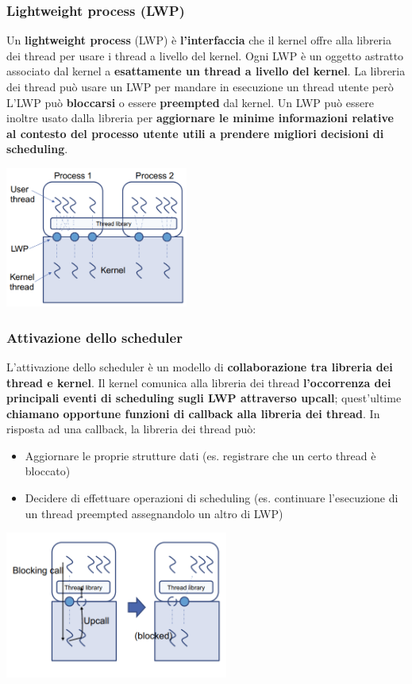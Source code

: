 \documentclass[12pt]{article}
\begin{document}
\subsubsection{Lightweight process (LWP)}
Un \textbf{lightweight process} (LWP) è \textbf{l'interfaccia} che il kernel offre alla libreria dei thread per usare i thread a livello del kernel. Ogni LWP è un oggetto astratto associato dal kernel a \textbf{esattamente un thread a livello del kernel}. La libreria dei thread può usare un LWP per mandare in esecuzione un thread utente però L'LWP può \textbf{bloccarsi} o essere \textbf{preempted} dal kernel. Un LWP può essere inoltre usato dalla libreria per \textbf{aggiornare le minime informazioni relative al contesto del processo utente utili a prendere migliori decisioni di scheduling}.
\begin{center}
    \includegraphics[width = 0.45\textwidth]{Images/65.PNG}
\end{center}
\subsubsection{Attivazione dello scheduler}
L'attivazione dello scheduler è un modello di \textbf{collaborazione tra libreria dei thread e kernel}. Il kernel comunica alla libreria dei thread \textbf{l'occorrenza dei principali eventi di scheduling sugli LWP attraverso upcall}; quest'ultime \textbf{chiamano opportune funzioni di callback alla libreria dei thread}. In risposta ad una callback, la libreria dei thread può:
\begin{itemize}
    \item Aggiornare le proprie strutture dati (es. registrare che un certo thread è bloccato)
    \item Decidere di effettuare operazioni di scheduling (es. continuare l'esecuzione di un thread preempted assegnandolo un altro di LWP)
\end{itemize}
\begin{center}
    \includegraphics[width = 0.55\textwidth]{Images/66.PNG}
\end{center}
\end{document}
